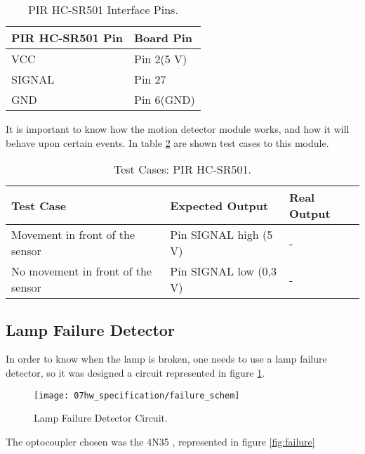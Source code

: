 \begin{table}[H]
	\centering
	\begin{tabular}{|m{5cm}|m{6cm}|}
		\hline
		\textbf{PIR HC-SR501 Pin} & \textbf{Board Pin}
		\\\hline\hline
		
		VCC & Pin 2(5 V)\\\hline
		SIGNAL & Pin 27\\\hline
		GND & Pin 6(GND)\\
		\hline
	\end{tabular}
	
\caption{PIR HC-SR501 Interface Pins.}
\label{table:pir}
\end{table}

It is important to know how the motion detector module works, and how it will behave upon certain events. In table \ref{table:test_pir} are shown test cases to this module.

\begin{table}[H]
	\centering
	\resizebox{\columnwidth}{!}
	{
		\begin{tabular}{|m{3cm}|m{5cm}||m{5cm}|}
			\hline
			\textbf{Test Case} & \textbf{Expected Output} & \textbf{Real Output}
			\\\hline\hline
			Movement in front of the sensor & Pin SIGNAL high (5 V) & -
			\\\hline
			No movement in front of the sensor & Pin SIGNAL low (0,3 V) & -
			\\\hline
		\end{tabular}
	}
	\caption{Test Cases: PIR HC-SR501.}
	\label{table:test_pir}
\end{table}

\subsection{Lamp Failure Detector}
In order to know when the lamp is broken, one needs to use a lamp failure detector, so it was designed a circuit represented in figure \ref{fig:failure_circuit}. 

\begin{figure}[H]
	\centering
	\texttt{[image: 07hw\_specification/failure\_schem]}
	\caption{Lamp Failure Detector Circuit.}
	\label{fig:failure_circuit}
\end{figure}

The optocoupler chosen was the 4N35 \cite{4n35}, represented in figure \ref{fig:failure}

